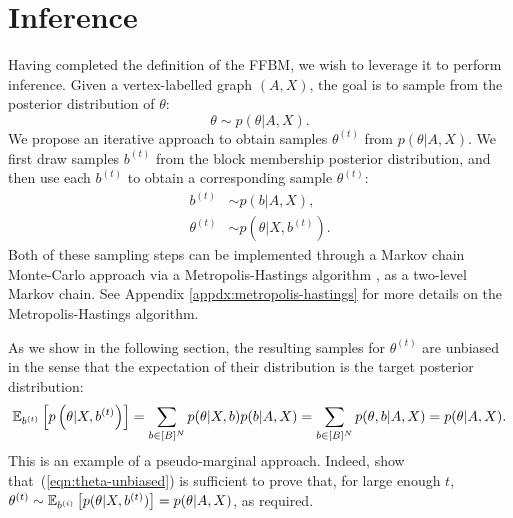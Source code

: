 \section{Inference}
\label{sec:inference}

Having completed the definition of the FFBM, we wish to leverage it 
to perform inference. Given a vertex-labelled graph $(A, X)$,
the goal is to sample from the posterior distribution
of $\theta$:
%
\begin{equation}
	\label{eqn:theta-target}
	\theta \sim p(\theta | A, X).
\end{equation}
%
We propose an iterative approach to obtain samples
$\theta^{(t)}$ from $p(\theta|A,X)$. We first draw samples $b^{(t)}$ 
from the block membership posterior distribution,
and then use each $b^{(t)}$ to obtain a corresponding
sample $\theta^{(t)}$:
%
\begin{align}
	b^{(t)} &\sim p ( b | A, X )  \label{eqn:b-samples},\\
	\theta^{(t)} &\sim p(\theta | X, b^{(t)} ). \label{eqn:theta-samples}
\end{align}
%
Both of these sampling steps can be implemented through a
Markov chain Monte-Carlo approach via a Metropolis-Hastings 
algorithm \cite{hastings-alg}, as a two-level Markov chain. See Appendix \ref{appdx:metropolis-hastings} for more details on the Metropolis-Hastings algorithm.
 
As we show in the following section, the resulting samples 
for $\theta^{(t)}$ are unbiased in the sense that the expectation of 
their distribution is the target posterior distribution:
%
\begin{equation}
\mathbb{E}_{b^{(t)}} \left[p \left( \theta | X, b^{(t)} \right) \right] = \sum_{b \in [B]^N} p(\theta | X, b) p(b | A, X) = \sum_{b \in [B]^N} p(\theta, b | A, X) = p(\theta | A, X).
\label{eqn:theta-unbiased}
\end{equation}
%
This is an example of a pseudo-marginal approach. Indeed, \citet{pseudo-marginal} show that~(\ref{eqn:theta-unbiased})
is sufficient to prove that, for large enough $t$, $\theta^{(t)} \sim \mathbb{E}_{b^{(i)}} \left[ p(\theta | X, b^{(t)})\right] = p(\theta 
| A, X)$, as required.

